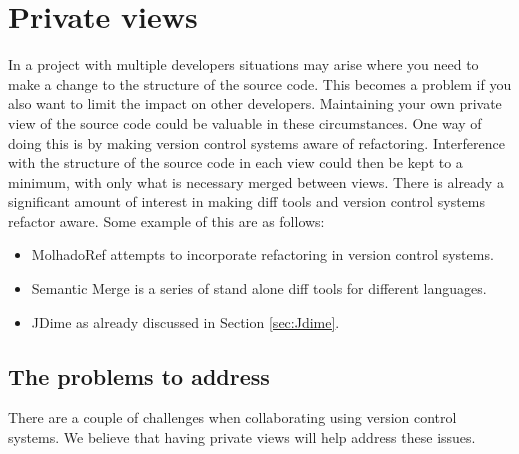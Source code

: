 
\chapter{Private views}

In a project with multiple developers situations may arise where you need to make a change to the structure of the source code. 
This becomes a problem if you also want to limit the impact on other developers.  
Maintaining your own private view of the source code could be valuable in these circumstances. 
One way of doing this is by making version control systems aware of refactoring. 
Interference with the structure of the source code in each view could then be kept to a minimum, with only what is necessary merged between views.
There is already a significant amount of interest in making diff tools and version control systems refactor aware. 
Some example of this are as follows:

\begin{itemize}
  \item MolhadoRef \cite{DannyDig} \cite{Dig2008} attempts to incorporate refactoring in version control systems.
  \item Semantic Merge \cite{CODICESOFTWARE} is a series of stand alone diff tools for different languages. 
  \item JDime as already discussed in Section \ref{sec:Jdime}.
\end{itemize}

\section{The problems to address}
There are a couple of challenges when collaborating using version control systems. We believe that having private views will help address these issues.  

